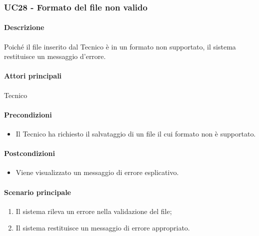 \subsubsection{UC28 - Formato del file non valido}\label{UC28}
\paragraph*{Descrizione}
Poiché il file inserito dal Tecnico è in un formato non supportato, il sistema restituisce un messaggio d'errore.

\paragraph*{Attori principali}
Tecnico

\paragraph*{Precondizioni}
\begin{itemize}
  \item Il Tecnico ha richiesto il salvataggio di un file il cui formato non è supportato.
\end{itemize}

\paragraph*{Postcondizioni}
\begin{itemize}
  \item Viene visualizzato un messaggio di errore esplicativo.
\end{itemize}

\paragraph*{Scenario principale}
\begin{enumerate}
  \item Il sistema rileva un errore nella validazione del file;
  \item Il sistema restituisce un messaggio di errore appropriato.
\end{enumerate}